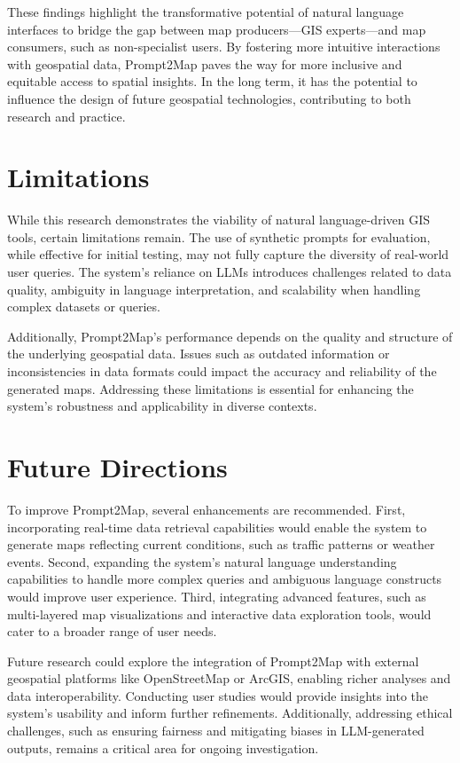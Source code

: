 These findings highlight the transformative potential of natural language interfaces to bridge the gap between map producers—GIS experts—and map consumers, such as non-specialist users. By fostering more intuitive interactions with geospatial data, Prompt2Map paves the way for more inclusive and equitable access to spatial insights. In the long term, it has the potential to influence the design of future geospatial technologies, contributing to both research and practice.

\section{Limitations}

While this research demonstrates the viability of natural language-driven GIS tools, certain limitations remain. The use of synthetic prompts for evaluation, while effective for initial testing, may not fully capture the diversity of real-world user queries. The system's reliance on LLMs introduces challenges related to data quality, ambiguity in language interpretation, and scalability when handling complex datasets or queries.

Additionally, Prompt2Map's performance depends on the quality and structure of the underlying geospatial data. Issues such as outdated information or inconsistencies in data formats could impact the accuracy and reliability of the generated maps. Addressing these limitations is essential for enhancing the system's robustness and applicability in diverse contexts.

\section{Future Directions}

To improve Prompt2Map, several enhancements are recommended. First, incorporating real-time data retrieval capabilities would enable the system to generate maps reflecting current conditions, such as traffic patterns or weather events. Second, expanding the system's natural language understanding capabilities to handle more complex queries and ambiguous language constructs would improve user experience. Third, integrating advanced features, such as multi-layered map visualizations and interactive data exploration tools, would cater to a broader range of user needs.

Future research could explore the integration of Prompt2Map with external geospatial platforms like OpenStreetMap or ArcGIS, enabling richer analyses and data interoperability. Conducting user studies would provide insights into the system's usability and inform further refinements. Additionally, addressing ethical challenges, such as ensuring fairness and mitigating biases in LLM-generated outputs, remains a critical area for ongoing investigation.